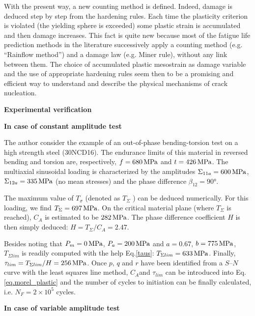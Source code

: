 With the present way, a new counting method is defined. Indeed, damage is deduced step by step from
the hardening rules. Each time the plasticity criterion is
violated (the yielding sphere is exceeded) some plastic
strain is accumulated and then damage increases. This
fact is quite new because most of the fatigue life prediction methods in the literature successively apply a counting method (e.g. ``Rainflow method'') and a damage law
(e.g. Miner rule), without any link between them. The
choice of accumulated plastic mesostrain as damage
variable and the use of appropriate hardening rules seem
then to be a promising and efficient way to understand
and describe the physical mechanisms of crack
nucleation.

\vspace{6pt}
\textbf{Experimental verification}
\vspace{6pt}

\textbf{In case of constant amplitude test }
\vspace{6pt}

The author \cite{FFE:FFE452} consider the example of an out-of-phase bending-torsion test on a high strength steel (30NCD16). The endurance limits of this material in reversed
bending and torsion are, respectively, $f=680\,\textnormal{MPa}$ and $t=426\,\textnormal{MPa}$.  The multiaxial sinusoidal loading is characterized by the amplitudes $\Sigma_{11a} =600\,\textnormal{MPa}$, $\Sigma_{12a} =335\,\textnormal{MPa}$ (no mean stresses)
and the phase difference $\beta_{12} =90°$.

The maximum value of $T_\sigma$ (denoted as $T_\Sigma$ ) can be deduced numerically. For this loading, we find $T_\Sigma=697\,\textnormal{MPa}$. On the critical material
plane (where $T_\Sigma$ is reached), $C_A$ is estimated to be $282\,\textnormal{MPa}$. The phase difference coefficient $H$ is
then simply deduced: $H=T_\Sigma /C_A =2.47$.

Besides noting that $P_m =0\,\textnormal{MPa}$, $P_a=200\,\textnormal{MPa}$ and $a=0.67$, $b=775\,\textnormal{MPa}$, $T_{\Sigma lim}$ is readily
computed with the help Eq.\eqref{taus}: $T_{\Sigma lim} =633\,\textnormal{MPa}$. Finally, $\tau_{lim} =T_{\Sigma lim} /H=256\,\textnormal{MPa}$. Once $p$, $q$ and $r$ have been identified from a $S–N$ curve with the least squares line method, $C_A $and $\tau_{lim}$ can
be introduced into Eq. \eqref{eq.morel_plastic} and the number of cycles to initiation can be finally calculated, i.e.
$N_F =2\times10^5$ cycles.

\vspace{6pt}
\textbf{In case of variable amplitude test }
\vspace{6pt}

